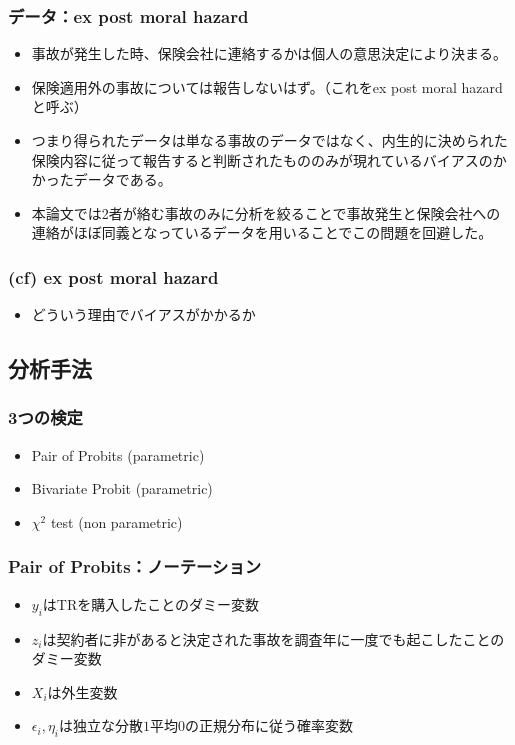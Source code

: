 \documentclass[dvipdfmx, 12pt]{beamer}
\begin{document}
\begin{frame}\frametitle{データ：ex post moral hazard}
	\begin{itemize}
	\item 事故が発生した時、保険会社に連絡するかは個人の意思決定により決まる。
	\item 保険適用外の事故については報告しないはず。（これをex post moral hazardと呼ぶ）
	\item つまり得られたデータは単なる事故のデータではなく、内生的に決められた保険内容に従って報告すると判断されたもののみが現れているバイアスのかかったデータである。
	\item 本論文では2者が絡む事故のみに分析を絞ることで事故発生と保険会社への連絡がほぼ同義となっているデータを用いることでこの問題を回避した。
	\end{itemize}
\end{frame}

\begin{frame}\frametitle{(cf) ex post moral hazard}
	\begin{itemize}
	\item どういう理由でバイアスがかかるか
	\end{itemize}
\end{frame}


\subsection{分析手法}
\begin{frame}\frametitle{3つの検定}
	\begin{itemize}
	\item Pair of Probits (parametric)
	\item Bivariate Probit (parametric)
	\item $\chi^2$ test (non parametric)
	\end{itemize}
\end{frame}

\begin{frame}\frametitle{Pair of Probits：ノーテーション}
	\begin{itemize}
	\item $y_i$はTRを購入したことのダミー変数
	\item $z_i$は契約者に非があると決定された事故を調査年に一度でも起こしたことのダミー変数
	\item $X_i$は外生変数
	\item $\epsilon_i, \eta_i$は独立な分散$1$平均$0$の正規分布に従う確率変数
	\end{itemize}
\end{frame}
\end{document}

